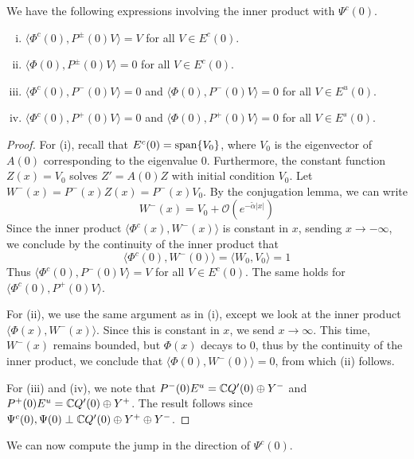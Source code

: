 \documentclass[thesis.tex]{subfiles}
\begin{document}
\begin{lemma}\label{PsiIP}
We have the following expressions involving the inner product with $\Psi^c(0)$.
\begin{enumerate}[(i)]
	\item $\langle \Phi^c(0), P^\pm(0) V \rangle = V$ for all $V \in E^c(0)$.
	\item $\langle \Phi(0), P^\pm(0) V \rangle = 0$ for all $V \in E^c(0)$.
	\item $\langle \Phi^c(0), P^-(0) V \rangle = 0$ and $\langle \Phi(0), P^-(0) V \rangle = 0$ for all $V \in E^u(0)$.
	\item $\langle \Phi^c(0), P^+(0) V \rangle = 0$ and $\langle \Phi(0), P^+(0) V \rangle = 0$ for all $V \in E^s(0)$.
\end{enumerate}
\begin{proof}
For (i), recall that $E^c(0) = \mathop\mathrm{span}\nolimits\{ V_0 \}$, where $V_0$ is the eigenvector of $A(0)$ corresponding to the eigenvalue 0. Furthermore, the constant function $Z(x) = V_0$ solves $Z' = A(0) Z$ with initial condition $V_0$. Let $W^-(x) = P^-(x) Z(x) = P^-(x) V_0$. By the conjugation lemma, we can write
\[
W^-(x) = V_0 + \mathcal{O}({e^{-\tilde{\alpha}|x|}})
\]
Since the inner product $\langle \Phi^c(x), W^-(x) \rangle$ is constant in $x$, sending $x \rightarrow -\infty$, we conclude by the continuity of the inner product that
\[
\langle \Phi^c(0), W^-(0) \rangle = \langle W_0, V_0 \rangle = 1 
\]
Thus $\langle \Phi^c(0), P^-(0) V \rangle = V$ for all $V \in E^c(0)$. The same holds for $\langle \Phi^c(0), P^+(0) V \rangle$.

For (ii), we use the same argument as in (i), except we look at the inner product $\langle \Phi(x), W^-(x) \rangle$. Since this is constant in $x$, we send $x \rightarrow \infty$. This time, $W^-(x)$ remains bounded, but $\Phi(x)$ decays to 0, thus by the continuity of the inner product, we conclude that $\langle \Phi(0), W^-(0) \rangle = 0$, from which (ii) follows.

For (iii) and (iv), we note that $P^-(0)E^u = \mathbb{C} Q'(0) \oplus Y^-$ and $P^+(0)E^u = \mathbb{C} Q'(0) \oplus Y^+$. The result follows since $\Psi^c(0), \Psi(0) \perp \mathbb{C} Q'(0) \oplus Y^+ \oplus Y^-$.
\end{proof}
\end{lemma}

We can now compute the jump in the direction of $\Psi^c(0)$.
\end{document}
